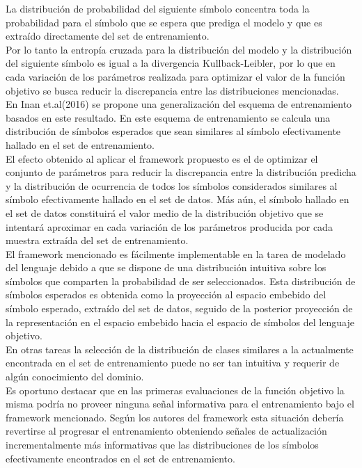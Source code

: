 \documentclass{article}
\begin{document}
	La distribución de probabilidad del siguiente símbolo concentra toda la probabilidad para el símbolo que se espera que prediga el modelo y que es extraído directamente del set de entrenamiento.\\
	Por lo tanto la entropía cruzada para la distribución del modelo y la distribución del siguiente símbolo es igual a la divergencia Kullback-Leibler\cite{63WordEmbeddingTyingTheory}, por lo que en cada variación de los parámetros realizada para optimizar el valor de la función objetivo se busca reducir la discrepancia entre las distribuciones mencionadas.\\
	En Inan et.al(2016)\cite{63WordEmbeddingTyingTheory} se propone una generalización del esquema de entrenamiento basados en este resultado. En este esquema de entrenamiento se calcula una distribución de símbolos esperados que sean similares al símbolo efectivamente hallado en el set de entrenamiento. \\
	El efecto obtenido al aplicar el framework propuesto es el de optimizar el conjunto de parámetros para reducir la discrepancia entre la distribución predicha y la distribución de ocurrencia de todos los símbolos considerados similares al símbolo efectivamente hallado en el set de datos. Más aún, el símbolo hallado en el set de datos constituirá el valor medio de la distribución objetivo que se intentará aproximar en cada variación de los parámetros producida por cada muestra extraída del set de entrenamiento.\\
	
	El framework mencionado es fácilmente implementable en la tarea de modelado del lenguaje debido a que se dispone de una distribución intuitiva sobre los símbolos que comparten la probabilidad de ser seleccionados. Esta distribución de símbolos esperados es obtenida como la proyección al espacio embebido del símbolo esperado, extraído del set de datos, seguido de la posterior proyección de la representación en el espacio embebido hacia el espacio de símbolos del lenguaje objetivo. \\
	En otras tareas la selección de la distribución de clases similares a la actualmente encontrada en el set de entrenamiento puede no ser tan intuitiva y requerir de algún conocimiento del dominio.\\
	
	Es oportuno destacar que en las primeras evaluaciones de la función objetivo la misma podría no proveer ninguna señal informativa para el entrenamiento bajo el framework mencionado. Según los autores del framework esta situación debería revertirse al progresar el entrenamiento obteniendo señales de actualización incrementalmente más informativas que las distribuciones de los símbolos efectivamente encontrados en el set de entrenamiento.
	
\end{document}

